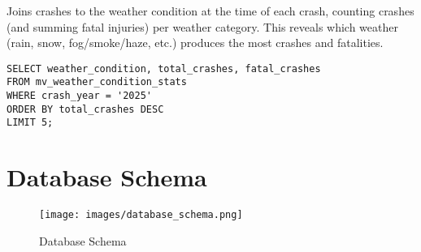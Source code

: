 \documentclass[12pt]{article}
\begin{document}
Joins crashes to the weather condition at the time of each crash, counting crashes (and summing fatal injuries) per weather category. This reveals which weather (rain, snow, fog/smoke/haze, etc.) produces the most crashes and fatalities. 

{\scriptsize
\begin{verbatim}
SELECT weather_condition, total_crashes, fatal_crashes
FROM mv_weather_condition_stats 
WHERE crash_year = '2025'
ORDER BY total_crashes DESC
LIMIT 5;
\end{verbatim}}



\section{Database Schema}

\begin{figure}
    \centering
    \texttt{[image: images/database\_schema.png]}
    \caption{Database Schema}
    \label{fig:enter-label}
\end{figure}
\end{document}
